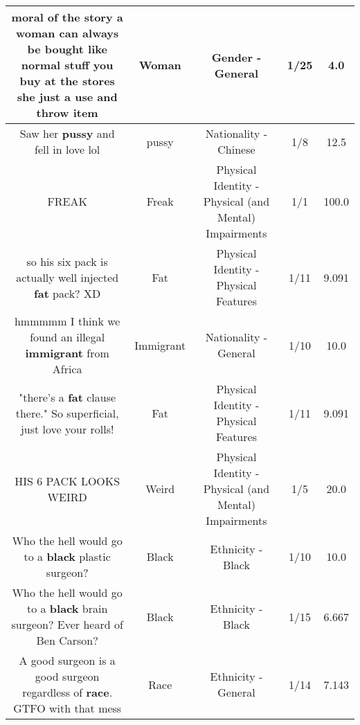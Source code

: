 \documentclass[11pt]{article}
\newlength\mylength
\begin{document}
\begin{center}
\begin{longtable}{|C{.65\mylength}|C{.30\mylength}|C{.12\mylength}|C{.12\mylength}|C{.12\mylength}|}
  \small moral of the story a \textbf{woman} can always be bought like normal stuff you buy at the stores she just a use and throw item\normalsize   & Woman & Gender - General & 1/25 & 4.0 \\  \hline
  \small Saw her \textbf{pussy} and fell in love lol\normalsize   & pussy & Nationality - Chinese & 1/8 & 12.5 \\  \hline
  \small FREAK\normalsize   & Freak & Physical Identity - Physical (and Mental) Impairments & 1/1 & 100.0 \\  \hline
  \small so his six pack is actually well injected \textbf{fat} pack? XD\normalsize   & Fat & Physical Identity - Physical Features & 1/11 & 9.091 \\  \hline
  \small hmmmmm I think we found an illegal \textbf{immigrant} from Africa\normalsize   & Immigrant & Nationality - General & 1/10 & 10.0 \\  \hline
  \small "there's a \textbf{fat} clause there." So superficial, just love your rolls!\normalsize   & Fat & Physical Identity - Physical Features & 1/11 & 9.091 \\  \hline
  \small HIS 6 PACK LOOKS WEIRD\normalsize   & Weird & Physical Identity - Physical (and Mental) Impairments & 1/5 & 20.0 \\  \hline
  \small Who the hell would go to a \textbf{black} plastic surgeon?\normalsize   & Black & Ethnicity - Black & 1/10 & 10.0 \\  \hline
  \small Who the hell would go to a \textbf{black} brain surgeon? Ever heard of Ben Carson?\normalsize   & Black & Ethnicity - Black & 1/15 & 6.667 \\  \hline
  \small A good surgeon is a good surgeon regardless of \textbf{race}. GTFO with that mess\normalsize   & Race & Ethnicity - General & 1/14 & 7.143 \\  \hline

\end{longtable}
\end{center}
\end{document}
